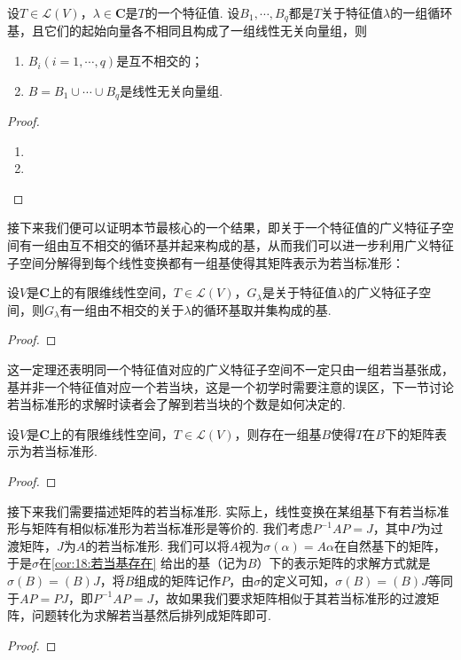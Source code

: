 \begin{theorem}
    设$T\in\mathcal{L}(V)$，$\lambda\in\mathbf{C}$是$T$的一个特征值. 设$B_1,\cdots,B_q$都是$T$关于特征值$\lambda$的一组循环基，且它们的起始向量各不相同且构成了一组线性无关向量组，则
    \begin{enumerate}
        \item $B_i(i=1,\cdots,q)$是互不相交的；
        \item $B=B_1\cup\cdots\cup B_q$是线性无关向量组.
    \end{enumerate}
\end{theorem}
\begin{proof}
    \begin{enumerate}
        \item
        \item
    \end{enumerate}
\end{proof}

接下来我们便可以证明本节最核心的一个结果，即关于一个特征值的广义特征子空间有一组由互不相交的循环基并起来构成的基，从而我们可以进一步利用广义特征子空间分解得到每个线性变换都有一组基使得其矩阵表示为若当标准形：
\begin{theorem}
    设$V$是$\mathbf{C}$上的有限维线性空间，$T\in\mathcal{L}(V)$，$G_\lambda$是关于特征值$\lambda$的广义特征子空间，则$G_\lambda$有一组由不相交的关于$\lambda$的循环基取并集构成的基.
\end{theorem}
\begin{proof}

\end{proof}

这一定理还表明同一个特征值对应的广义特征子空间不一定只由一组若当基张成，基并非一个特征值对应一个若当块，这是一个初学时需要注意的误区，下一节讨论若当标准形的求解时读者会了解到若当块的个数是如何决定的.

\begin{corollary} \label{cor:18:若当基存在}
    设$V$是$\mathbf{C}$上的有限维线性空间，$T\in\mathcal{L}(V)$，则存在一组基$B$使得$T$在$B$下的矩阵表示为若当标准形.
\end{corollary}
\begin{proof}

\end{proof}

接下来我们需要描述矩阵的若当标准形. 实际上，线性变换在某组基下有若当标准形与矩阵有相似标准形为若当标准形是等价的. 我们考虑$P^{-1}AP=J$，其中$P$为过渡矩阵，$J$为$A$的若当标准形. 我们可以将$A$视为$\sigma(\alpha)=A\alpha$在自然基下的矩阵，于是$\sigma$在\autoref{cor:18:若当基存在} 给出的基（记为$B$）下的表示矩阵的求解方式就是$\sigma(B)=(B)J$，将$B$组成的矩阵记作$P$，由$\sigma$的定义可知，$\sigma(B)=(B)J$等同于$AP=PJ$，即$P^{-1}AP=J$，故如果我们要求矩阵相似于其若当标准形的过渡矩阵，问题转化为求解若当基然后排列成矩阵即可.
\begin{corollary}

\end{corollary}
\begin{proof}

\end{proof}


